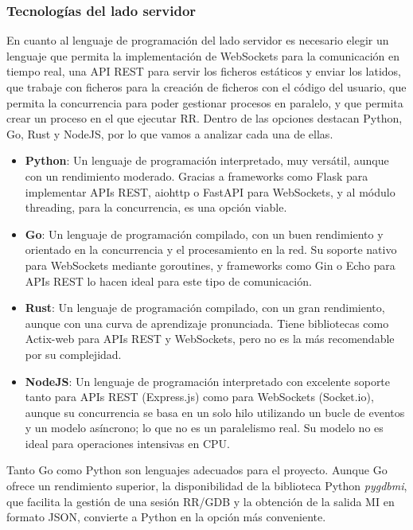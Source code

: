 \subsubsection{Tecnologías del lado servidor} \label{sec:tecnologias-servidor}

En cuanto al lenguaje de programación del lado servidor es necesario elegir un lenguaje que permita la implementación de WebSockets para la comunicación en tiempo real, una API REST para servir los ficheros estáticos y enviar los latidos, que trabaje con ficheros para la creación de ficheros con el código del usuario, que permita la concurrencia para poder gestionar \glspl{proceso} en paralelo, y que permita crear un \gls{proceso} en el que ejecutar RR.
Dentro de las opciones destacan Python, Go, Rust y NodeJS, por lo que vamos a analizar cada una de ellas.

\begin{itemize}
    \item \textbf{Python}: Un lenguaje de programación interpretado, muy versátil, aunque con un rendimiento moderado. Gracias a frameworks como Flask para implementar APIs REST, aiohttp o FastAPI para WebSockets, y al módulo threading, para la concurrencia, es una opción viable.
    \item \textbf{Go}: Un lenguaje de programación compilado, con un buen rendimiento y orientado en la concurrencia y el procesamiento en la red. Su soporte nativo para WebSockets mediante goroutines, y frameworks como Gin o Echo para APIs REST lo hacen ideal para este tipo de comunicación.
    \item \textbf{Rust}: Un lenguaje de programación compilado, con un gran rendimiento, aunque con una curva de aprendizaje pronunciada. Tiene bibliotecas como Actix-web para APIs REST y WebSockets, pero no es la más recomendable por su complejidad. 
    \item \textbf{NodeJS}: Un lenguaje de programación interpretado con excelente soporte tanto para APIs REST (Express.js) como para WebSockets (Socket.io), aunque su concurrencia se basa en un solo hilo utilizando un bucle de eventos y un modelo asíncrono; lo que no es un paralelismo real. Su modelo no es ideal para operaciones intensivas en CPU.
\end{itemize}

Tanto Go como Python son lenguajes adecuados para el proyecto. Aunque Go ofrece un rendimiento superior, la disponibilidad de la biblioteca Python \textit{pygdbmi}, que facilita la gestión de una sesión RR/GDB y la obtención de la salida MI en formato JSON, convierte a Python en la opción más conveniente.

